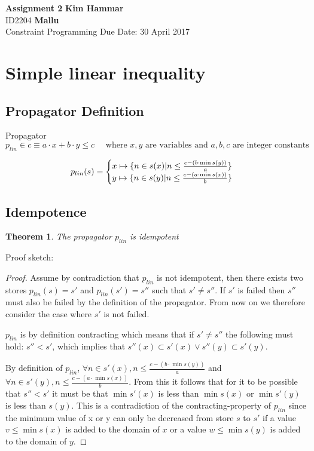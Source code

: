 \documentclass[a4paper, 11pt]{article}
\newtheorem{theorem}{Theorem}[section]
\newcommand\mymapsto{\mathrel{\ooalign{$\rightarrow$\cr%
      \kern-.15ex\raise.275ex\hbox{\scalebox{1}[0.522]{$\mid$}}\cr}}}
\begin{document}
\noindent
\large\textbf{Assignment 2} \hfill \textbf{Kim Hammar} \\
\normalsize ID2204 \hfill  \textbf{Mallu} \\
Constraint Programming \hfill Due Date: 30 April 2017\\

\section*{Simple linear inequality}
\subsection*{Propagator Definition}
Propagator $p_{lin} \in c \equiv a \cdot x + b \cdot y \leq c \quad \text{ where }x,y \text{ are variables and } a,b,c \text{ are integer constants} $

\begin{gather*}
p_{lin}(s) = 
\begin{cases}
  x \mymapsto \{n \in s(x) | n \leq \frac{c - (b \cdot \min s(y))}{a} \}\\
  y \mymapsto \{n \in s(y) | n \leq \frac{c - (a \cdot \min s(x))}{b} \}\\
\end{cases}
\end{gather*}
\subsection*{Idempotence}
\begin{theorem}
The propagator $p_{lin}$ is idempotent
\end{theorem}
Proof sketch:
\begin{proof}
Assume by contradiction that $p_{lin}$ is not idempotent, then there exists two stores $p_{lin}(s) = s'$ and $p_{lin}(s') = s''$ such that  $s' \neq s''$. If $s'$ is failed then $s''$ must also be failed by the definition of the propagator. From now on we therefore consider the case where $s'$ is not failed.

  $p_{lin}$ is by definition contracting which means that if $s' \neq s''$ the following must hold: $s'' < s'$, which implies that $s''(x) \subset s'(x) \lor s''(y) \subset s'(y)$.

By definition of $p_{lin}$, $\forall n \in s'(x), n \leq  \frac{c - (b \cdot \min s(y))}{a}$ and $\forall n \in s'(y), n \leq  \frac{c - (a \cdot \min s(x))}{b}$. From this it follows that for it to be possible that $s'' < s'$ it must be that $\min s'(x)$ is less than $\min s(x)$ or $\min s'(y)$ is less than $s(y)$. This is a contradiction of the contracting-property of $p_{lin}$ since the minimum value of x or y can only be decreased from store $s$ to $s'$ if a value $v \leq \min s(x)$ is added to the domain of $x$ or a value $w \leq \min s(y)$ is added to the domain of $y$.
\end{proof}
\end{document}
